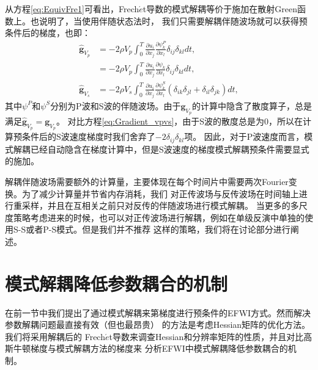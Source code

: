 从方程\eqref{eq:EquivFre1}可看出，Frech$\acute{e}$t导数的模式解耦等价于施加在散射Green函数上。也说明了，当使用伴随状态法时，
我们只需要解耦伴随波场就可以获得预条件后的梯度，也即：
\begin{equation} 
        \begin{split} 
                \hat{\mathbf{g}}_{V_p}&=-2\rho V_p\int_{0}^{T}\frac{\partial u_i}{\partial
        x_j}\frac{\partial \psi^P_k}{\partial x_l}
        \delta_{ij}\delta_{kl}dt,\\
        &=-2\rho V_p\int_{0}^{T}\frac{\partial u_i}{\partial
        x_j}\frac{\partial \psi_k}{\partial x_l}
        \delta_{ij}\delta_{kl}dt,\\
                \hat{\mathbf{g}}_{V_s}&=-2\rho V_s\int_{0}^{T}\frac{\partial u_i}{\partial
        x_j}\frac{\partial \psi^S_k}{\partial x_l}
        (\delta_{ik}\delta_{jl}+\delta_{il}\delta_{jk})dt,
        \end{split}
        \label{eq:DeGradient_vpvs} 
\end{equation}
其中$\psi^P$和$\psi^S$分别为P波和S波的伴随波场。由于$\mathbf{g}_{V_p}$的计算中隐含了散度算子，总是满足$\hat{\mathbf{g}}_{V_p}=\mathbf{g}_{V_p}$。
对比方程\eqref{eq:Gradient_vpvs}，由于S波的散度总是为0，所以在计算预条件后的S波速度梯度时我们舍弃了$-2\delta_{ij}\delta_{kl}$项。
因此，对于P波速度而言，模式解耦已经自动隐含在梯度计算中，但是S波速度的梯度模式解耦预条件需要显式的施加。

解耦伴随波场需要额外的计算量，主要体现在每个时间片中需要两次Fourier变换。为了减少计算量并节省内存消耗，我们
对正传波场与反传波场在时间轴上进行重采样，并且在互相关之前只对反传的伴随波场进行模式解耦。
当更多的多尺度策略考虑进来的时候，也可以对正传波场进行解耦，例如在单级反演中单独的使用S-S或者P-S模式。但是我们并不推荐
这样的策略，我们将在讨论部分进行阐述。
\section{模式解耦降低参数耦合的机制}
	在前一节中我们提出了通过模式解耦来第梯度进行预条件的EFWI方式。然而解决参数解耦问题最直接有效（但也最昂贵）
的方法是考虑Hessian矩阵的优化方法。我们将采用解耦后的
Frech$\acute{e}$t导数来调查Hessian和分辨率矩阵的性质，并且对比高斯牛顿梯度与模式解耦方法的梯度来
分析EFWI中模式解耦降低参数耦合的机制。
